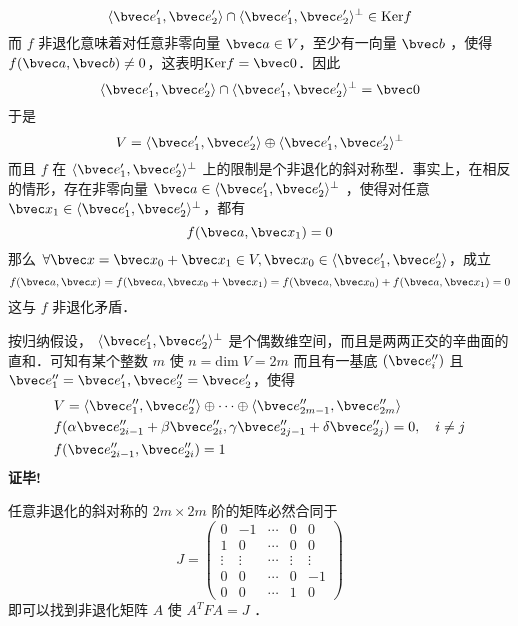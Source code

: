 \begin{equation}
\langle\bvec e'_1,\bvec e'_2\rangle\cap\langle\bvec e'_1,\bvec e'_2\rangle^{\perp}\in \mathrm{Ker} f
\end{equation}
而 $f$ 非退化意味着对任意非零向量 $\bvec a\in V$，至少有一向量 $\bvec b$ ，使得 $f(\bvec a,\bvec b)\neq0$，这表明$\mathrm{Ker} f=\bvec 0$．因此
\begin{equation}
\langle\bvec e'_1,\bvec e'_2\rangle\cap\langle\bvec e'_1,\bvec e'_2\rangle^{\perp}=\bvec 0
\end{equation}
于是
\begin{equation}
V=\langle\bvec e'_1,\bvec e'_2\rangle\oplus\langle\bvec e'_1,\bvec e'_2\rangle^{\perp}
\end{equation}
而且 $f$ 在 $\langle\bvec e'_1,\bvec e'_2\rangle^{\perp}$ 上的限制是个非退化的斜对称型．事实上，在相反的情形，存在非零向量 $\bvec a\in \langle\bvec e'_1,\bvec e'_2\rangle^{\perp}$ ，使得对任意 $\bvec x_1\in\langle\bvec e'_1,\bvec e'_2\rangle^{\perp}$，都有
\begin{equation}
f(\bvec a,\bvec x_1)=0
\end{equation}
那么 $\forall \bvec x=\bvec x_0+\bvec x_1\in V,\bvec x_0\in\langle\bvec e'_1,\bvec e'_2\rangle$，成立
\begin{equation}
f(\bvec a,\bvec x)=f(\bvec a,\bvec x_0+\bvec x_1)=f(\bvec a,\bvec x_0)+f(\bvec a,\bvec x_1)=0
\end{equation}
这与 $f$ 非退化矛盾．

按归纳假设， $\langle\bvec e'_1,\bvec e'_2\rangle^{\perp}$ 是个偶数维空间，而且是两两正交的辛曲面的直和．可知有某个整数 $m$ 使 $n=\mathrm{dim}\;V=2m$ 而且有一基底 $(\bvec e_i'')$ 且 $\bvec e''_1=\bvec e'_1,\bvec e''_2=\bvec e'_2$，使得
\begin{equation}
 \begin{aligned}
 &V=\langle\bvec e''_1,\bvec e''_2\rangle\oplus\cdots\oplus\langle\bvec e''_{2m-1},\bvec e''_{2m}\rangle\\
&f(\alpha\bvec e''_{2i-1}+\beta\bvec e''_{2i},\gamma\bvec e''_{2j-1}+\delta\bvec e''_{2j})=0,\quad i\neq j\\
 &f(\bvec e''_{2i-1},\bvec e''_{2i})=1
 \end{aligned}
 \end{equation}
 \textbf{证毕!}
 \begin{corollary}{}
 任意非退化的斜对称的 $2m\times2m$ 阶的矩阵必然合同于
 \begin{equation}
 J=\begin{pmatrix}
 0&-1&\cdots&0&0\\
 1&0&\cdots&0&0\\
 \vdots&\vdots&\cdots&\vdots&\vdots\\
 0&0&\cdots&0&-1\\
 0&0&\cdots&1&0
 \end{pmatrix}
 \end{equation}
 即可以找到非退化矩阵 $A$ 使 $A^{T}FA=J$ ．
 \end{corollary}
 